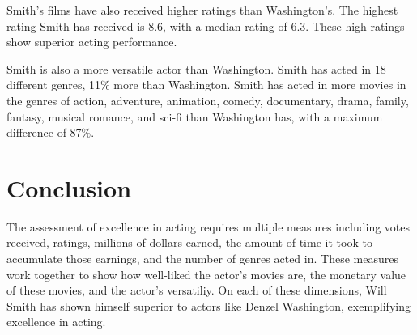 \documentclass[]{article}
\begin{document}
Smith's films have also received higher ratings than Washington's. The
highest rating Smith has received is 8.6, with a median rating of 6.3.
These high ratings show superior acting performance.

Smith is also a more versatile actor than Washington. Smith has acted in
18 different genres, 11\% more than Washington. Smith has acted in more
movies in the genres of action, adventure, animation, comedy,
documentary, drama, family, fantasy, musical romance, and sci-fi than
Washington has, with a maximum difference of 87\%.

\section{ Conclusion}
\label{sec:conclusion}

The assessment of excellence in acting requires multiple measures
including votes received, ratings, millions of dollars earned, the
amount of time it took to accumulate those earnings, and the number of
genres acted in. These measures work together to show how well-liked the
actor's movies are, the monetary value of these movies, and the actor's
versatiliy. On each of these dimensions, Will Smith has shown himself
superior to actors like Denzel Washington, exemplifying excellence in
acting.






\newpage
\theendnotes

\newpage
\begin{auxmulticols}{1}
\singlespacing 


\end{auxmulticols}

\newpage
{
\hypersetup{linkcolor=black}
\setcounter{tocdepth}{3}
\tableofcontents
}
\end{document}

